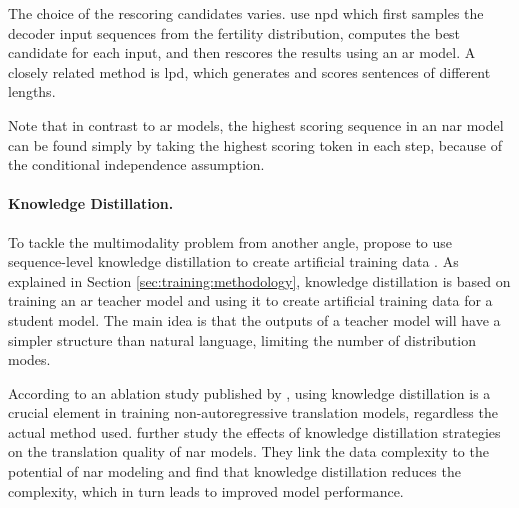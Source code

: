The choice of the rescoring candidates varies. \citet{gu2017nonautoregressive}
use \ac{npd} which first samples the decoder input sequences from the fertility
distribution, computes the best candidate for each input, and then rescores the
results using an \ac{ar} model. A closely related method is \ac{lpd}, which
generates and scores sentences of different lengths.

Note that in contrast to \ac{ar} models, the highest scoring sequence in an
\acs{nar} model can be found simply by taking the highest scoring token in each
step, because of the conditional independence assumption.

\paragraph{Knowledge Distillation.} To tackle the multimodality problem from
another angle, \citet{gu2017nonautoregressive} propose to use sequence-level
knowledge distillation to create artificial training data
\citep{kim-rush-2016-sequence}. As explained in Section
\ref{sec:training:methodology}, knowledge distillation is based on training an
\ac{ar} teacher model and using it to create artificial training data for a
student model. The main idea is that the outputs of a teacher model will have a
simpler structure than natural language, limiting the number of distribution
modes.

According to an ablation study published by \citet{gu-kong-2021-fully}, using
knowledge distillation is a crucial element in training non-autoregressive
translation models, regardless the actual method used.
\citet{zhou-etal-2020-understanding} further study the effects of knowledge
distillation strategies on the translation quality of \ac{nar} models. They
link the data complexity to the potential of \ac{nar} modeling and find that
knowledge distillation reduces the complexity, which in turn leads to improved
model performance.

